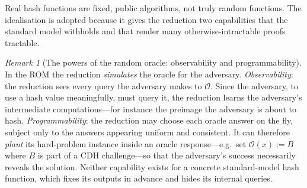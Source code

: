 \documentclass[11pt,a4paper]{article}
\theoremstyle{definition}
\theoremstyle{remark}
\newtheorem{remark}[theorem]{Remark}
\begin{document}
Real hash functions are fixed, public algorithms, not truly random
functions. The idealisation is adopted because it gives the reduction
two capabilities that the standard model withholds and that render
many otherwise-intractable proofs tractable.

\begin{remark}[The powers of the random oracle: observability and
programmability]\label{model:rem:rom-powers}
In the ROM the reduction \emph{simulates} the oracle for the
adversary. \emph{Observability}: the reduction sees every query the adversary
makes to \(\mathcal{O}\). Since the adversary, to use a hash value
meaningfully, must query it, the reduction learns the adversary's
intermediate computations---for instance the preimage the adversary is
about to hash. \emph{Programmability}: the reduction may choose each
oracle answer on the fly, subject only to the answers appearing
uniform and consistent. It can therefore \emph{plant} its hard-problem
instance inside an oracle response---e.g.\ set
\(\mathcal{O}(x) := B\) where \(B\) is part of a CDH challenge---so
that the adversary's success necessarily reveals the solution.
Neither capability exists for a concrete standard-model hash function,
which fixes its outputs in advance and hides its internal queries.
\end{remark}
\end{document}
